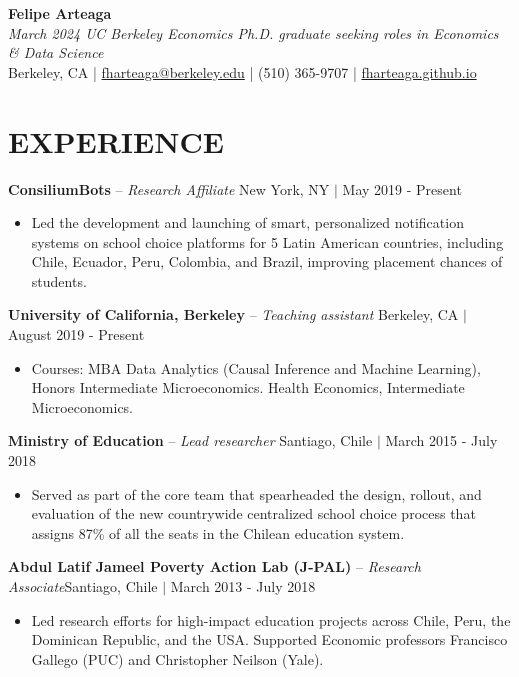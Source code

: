 \documentclass[letter,9pt]{extarticle}
\begin{document}
\pagestyle{empty}



\begin{center}
{\Large \textbf{Felipe Arteaga}}\\[2pt] %
\textit{March 2024 UC Berkeley Economics Ph.D. graduate seeking roles in Economics \& Data Science}\\[3pt]
Berkeley, CA | \href{mailto:fharteaga@berkeley.edu}{fharteaga@berkeley.edu} | (510) 365-9707 | \href{https://fharteaga.github.io/}{fharteaga.github.io} 
\end{center}

\section*{EXPERIENCE}
\noindent
\textbf{ConsiliumBots} -- \textit{Research Affiliate}  \hfill New York, NY $|$ May 2019 - Present %
\begin{itemize}
    \item Led the development and launching of smart, personalized notification systems on school choice platforms for 5 Latin American countries, including Chile, Ecuador, Peru, Colombia, and Brazil, improving placement chances of students.  %
\end{itemize}
\noindent
\textbf{University of California, Berkeley} -- \textit{Teaching assistant} \hfill Berkeley, CA $|$ August 2019 - Present
\begin{itemize}
    \item Courses: MBA Data Analytics (Causal Inference and Machine Learning), Honors Intermediate Microeconomics.
Health Economics, Intermediate Microeconomics.  %
\end{itemize}
\noindent
\textbf{Ministry of Education} -- \textit{Lead researcher}  \hfill Santiago, Chile $|$ March 2015 - July 2018 %
\begin{itemize}
    \item Served as part of the core team that spearheaded the design, rollout, and evaluation of the new countrywide centralized school choice process that assigns 87\% of all the seats in the Chilean education system. %
\end{itemize}
\noindent
\textbf{Abdul Latif Jameel Poverty Action Lab (J-PAL)} -- \textit{Research Associate}\hfill Santiago, Chile $|$ March 2013 - July 2018 %
\begin{itemize}
    \item Led research efforts for high-impact education projects across Chile, Peru, the Dominican Republic, and the USA. Supported Economic professors Francisco Gallego (PUC) and Christopher Neilson (Yale).
\end{itemize}
\end{document}
